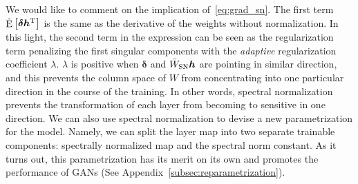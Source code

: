 \documentclass{article}
\newcommand{\bmh}{{\bm h}}
\newcommand{\bmdelta}{{\bm \delta}}
\newcommand{\E}{\mathop{\mathrm{E}}}
\begin{document}
We would like to comment on the implication of~\eqref{eq:grad_sn}.
The first term $\hat{\E}\left[\bmdelta \bmh^{\rm T}\right]$ is the same as the derivative of the weights without normalization.
In this light, the second term in the expression can be seen as the regularization term penalizing the first singular components with the \textit{adaptive} regularization coefficient $\lambda$.
$\lambda$ is positive when $\bmdelta$ and $\bar{W}_{\rm SN} \bmh$ are pointing in similar direction, and this prevents the column space of $W$ from concentrating into one particular direction in the course of the training.
In other words, spectral normalization prevents the transformation of each layer from becoming to sensitive in one direction.
We can also use spectral normalization to devise a new parametrization for the model. 
Namely, we can split the layer map into two separate trainable components: spectrally normalized map and the spectral norm constant. As it turns out, this parametrization has its merit on its own and promotes the performance of GANs (See Appendix~\ref{subsec:reparametrization}).
%
\end{document}
